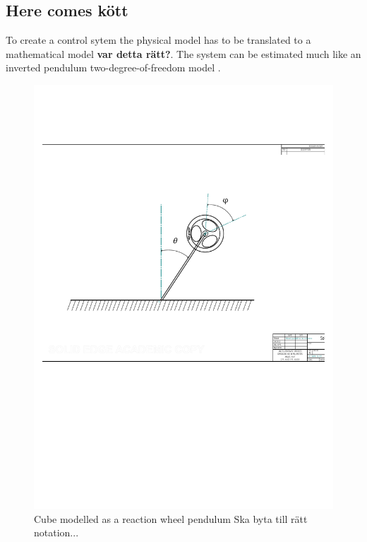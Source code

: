 \documentclass[a4paper,11pt]{kth-mag}
\begin{document}
\subsection{Here comes kött}
To create a control sytem the physical model has to be translated to a mathematical model \textbf{var detta rätt?}. The system can be estimated much like an inverted pendulum two-degree-of-freedom model \cite{KTHpendulum}.
\begin{figure}[!htb]
\centering
\includegraphics[scale=.6]{Lagrangeflywheel.pdf}
\caption{Cube modelled as a reaction wheel pendulum Ska byta till rätt notation...}
\label{fig:Lagrangeflywheel}
\end{figure}
\end{document}
